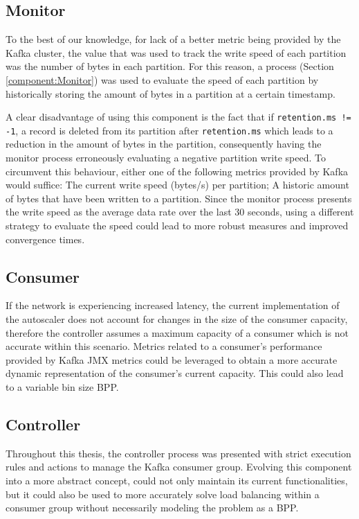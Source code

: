 \subsection{Monitor}

To the best of our knowledge, for lack of a better metric being provided by the
Kafka cluster, the value that was used to track the write speed of each
partition was the number of bytes in each partition. For this reason, a process
(Section \ref{component:Monitor}) was used to evaluate the speed of each partition by
historically storing the amount of bytes in a partition at a certain timestamp.

A clear disadvantage of using this component is the fact that if
\lstinline{retention.ms != -1}, a record is deleted from its partition after
\lstinline{retention.ms} which leads to a reduction in the amount of bytes in
the partition, consequently having the monitor process erroneously evaluating a
negative partition write speed. To circumvent this behaviour, either one of the
following metrics provided by Kafka would suffice: The current write speed
(bytes/s) per partition; A historic amount of bytes that have been written to a
partition. Since the monitor process presents the write speed as the average
data rate over the last 30 seconds, using a different strategy to evaluate the
speed could lead to more robust measures and improved convergence times.

\subsection{Consumer}

If the network is experiencing increased latency, the current implementation of
the autoscaler does not account for changes in the size of the consumer
capacity, therefore the controller assumes a maximum capacity of a consumer
which is not accurate within this scenario. Metrics related to a consumer's
performance provided by Kafka JMX metrics could be leveraged to obtain a more
accurate dynamic representation of the consumer's current capacity. This could
also lead to a variable bin size BPP.

\subsection{Controller}

Throughout this thesis, the controller process was presented with strict
execution rules and actions to manage the Kafka consumer group. Evolving this
component into a more abstract concept, could not only maintain its current
functionalities, but it could also be used to more accurately solve load
balancing within a consumer group without necessarily modeling the problem as a
BPP. 

